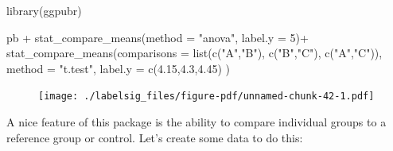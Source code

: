 \documentclass[
  letterpaper,
  DIV=11,
  numbers=noendperiod]{scrreprt}
\newenvironment{Shaded}{\begin{snugshade}}{\end{snugshade}}
\newcommand{\AttributeTok}[1]{\textcolor[rgb]{0.40,0.45,0.13}{#1}}
\newcommand{\DecValTok}[1]{\textcolor[rgb]{0.68,0.00,0.00}{#1}}
\newcommand{\FloatTok}[1]{\textcolor[rgb]{0.68,0.00,0.00}{#1}}
\newcommand{\FunctionTok}[1]{\textcolor[rgb]{0.28,0.35,0.67}{#1}}
\newcommand{\NormalTok}[1]{\textcolor[rgb]{0.00,0.23,0.31}{#1}}
\newcommand{\SpecialCharTok}[1]{\textcolor[rgb]{0.37,0.37,0.37}{#1}}
\newcommand{\StringTok}[1]{\textcolor[rgb]{0.13,0.47,0.30}{#1}}
\begin{document}
\begin{Shaded}
\begin{Highlighting}[]
\FunctionTok{library}\NormalTok{(ggpubr)}

\NormalTok{pb }\SpecialCharTok{+}  
  \FunctionTok{stat\_compare\_means}\NormalTok{(}\AttributeTok{method =} \StringTok{"anova"}\NormalTok{, }\AttributeTok{label.y =} \DecValTok{5}\NormalTok{)}\SpecialCharTok{+}
  \FunctionTok{stat\_compare\_means}\NormalTok{(}\AttributeTok{comparisons =} \FunctionTok{list}\NormalTok{(}\FunctionTok{c}\NormalTok{(}\StringTok{"A"}\NormalTok{,}\StringTok{"B"}\NormalTok{),}
                                        \FunctionTok{c}\NormalTok{(}\StringTok{"B"}\NormalTok{,}\StringTok{"C"}\NormalTok{),}
                                        \FunctionTok{c}\NormalTok{(}\StringTok{"A"}\NormalTok{,}\StringTok{"C"}\NormalTok{)), }
                     \AttributeTok{method =} \StringTok{"t.test"}\NormalTok{, }
                     \AttributeTok{label.y =} \FunctionTok{c}\NormalTok{(}\FloatTok{4.15}\NormalTok{,}\FloatTok{4.3}\NormalTok{,}\FloatTok{4.45}\NormalTok{)}
\NormalTok{  )}
\end{Highlighting}
\end{Shaded}

\begin{figure}[H]

{\centering \texttt{[image: ./labelsig\_files/figure-pdf/unnamed-chunk-42-1.pdf]}

}

\end{figure}

A nice feature of this package is the ability to compare individual
groups to a reference group or control. Let's create some data to do
this:
\end{document}
